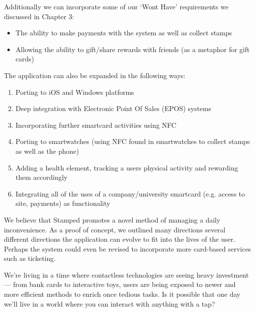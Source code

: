 Additionally we can incorporate some of our `Wont Have' requirements we discussed in Chapter 3:
\begin{itemize}
\item The ability to make payments with the system as well as collect stamps
\item Allowing the ability to gift/share rewards with friends (as a metaphor for gift cards)
\end{itemize}
\newpage
The application can also be expanded in the following ways:
\begin{enumerate}
\item Porting to iOS and Windows platforms
\item Deep integration with Electronic Point Of Sales (EPOS) systems
\item Incorporating further smartcard activities using NFC
\item Porting to smartwatches (using NFC found in smartwatches to collect stamps as well as the phone)
\item Adding a health element, tracking a users physical activity and rewarding them accordingly
\item Integrating all of the uses of a company/university smartcard (e.g. access to site, payments) as functionality
\end{enumerate}

We believe that Stamped promotes a novel method of managing a daily inconvenience. As a proof of concept, we outlined many directions several different directions the application can evolve to fit into the lives of the user. Perhaps the system could even be revised to incorporate more card-based services such as ticketing.

We're living in a time where contactless technologies are seeing heavy investment --- from bank cards to interactive toys, users are being exposed to newer and more efficient methods to enrich once tedious tasks. Is it possible that one day we'll live in a world where you can interact with anything with a tap?
